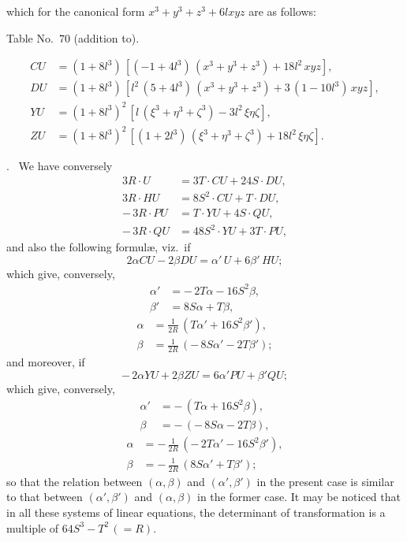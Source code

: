 \documentclass[11pt]{article}
\begin{document}
\noindent which for the canonical form $x^3 + y^3 + z^3 + 6 l x y z$ are as follows:
\begin{center}Table No.~70 (addition to).\end{center}
\[
\begin{aligned}
   C U &= (1 + 8 l^3)\,[(-1 + 4 l^3)\,(x^3 + y^3 + z^3) + 18 l^2\,x y z],\\
   D U &= (1 + 8 l^3)\,[l^2\,(5 + 4 l^3)\,(x^3 + y^3 + z^3) + 3\,(1 - 10 l^3)\,x y z],\\
   Y U &= (1 + 8 l^3)^2\,[l\,(\xi^3 + \eta^3 + \zeta^3) - 3 l^2\,\xi\eta\zeta],\\
   Z U &= (1 + 8 l^3)^2\,[(1 + 2 l^3)\,(\xi^3 + \eta^3 + \zeta^3) + 18 l^2\,\xi\eta\zeta].
\end{aligned}
\]

\medskip

. \ We have conversely
\[
\begin{aligned}
   3 R\cdot U &= 3 T\cdot C U + 24 S\cdot D U,\\
   3 R\cdot H U &= 8 S^2\cdot C U + T\cdot D U,\\
   -\,3 R\cdot P U &= T\cdot Y U + 4 S\cdot Q U,\\
   -\,3 R\cdot Q U &= 48 S^2\cdot Y U + 3 T\cdot P U,
\end{aligned}
\]
and also the following formul\ae, viz.\ if
\[
   2\alpha C U - 2\beta D U = \alpha'\,U + 6\beta'\,H U;
\]
which give, conversely,
\[
\begin{aligned}
   \alpha' &= -\,2 T\alpha - 16 S^2\beta,\\
   \beta' &= 8 S\alpha + T\beta,
\end{aligned}
\]
\[
\begin{aligned}
   \alpha &= \tfrac{1}{2 R}\,(T\alpha' + 16 S^2\beta'),\\
   \beta &= \tfrac{1}{2 R}\,(-\,8 S\alpha' - 2 T\beta');
\end{aligned}
\]
and moreover, if
\[
   -\,2\alpha Y U + 2\beta Z U = 6\alpha' P U + \beta' Q U;
\]
which give, conversely,
\[
\begin{aligned}
   \alpha' &= -\,(T\alpha + 16 S^2\beta),\\
   \beta &= -\,(-\,8 S\alpha - 2 T\beta),
\end{aligned}
\]
\[
\begin{aligned}
   \alpha &= -\,\tfrac{1}{2 R}\,(-\,2 T\alpha' - 16 S^2\beta'),\\
   \beta &= -\,\tfrac{1}{2 R}\,(8 S\alpha' + T\beta');
\end{aligned}
\]
so that the relation between $(\alpha, \beta)$ and $(\alpha', \beta')$ in the present case is similar to that between $(\alpha', \beta')$ and $(\alpha, \beta)$ in the former case. It may be noticed that in all these systems of linear equations, the determinant of transformation is a multiple of $64 S^3 - T^2\,(= R)$.
\end{document}
